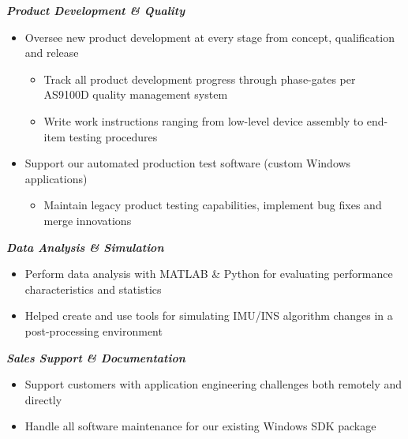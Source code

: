 \documentclass[]{article}
\begin{document}
\begin{singlespace}
\noindent\textbf{\emph{Product Development \& Quality}}
\vspace{-2mm}
\begin{itemize}
    \setlength\itemsep{0em}
    \item Oversee new product development at every stage from concept, qualification and release
    \vspace{-2mm}
    \begin{itemize}
        \setlength\itemsep{0em}
        \item Track all product development progress through phase-gates per AS9100D quality management system
        \item Write work instructions ranging from low-level device assembly to end-item testing procedures
    \end{itemize}
    \item Support our automated production test software (custom Windows applications)
    \vspace{-2mm}
    \begin{itemize}
        \setlength\itemsep{0em}
        \item Maintain legacy product testing capabilities, implement bug fixes and merge innovations
    \end{itemize}
\end{itemize}

\noindent\textbf{\emph{Data Analysis \& Simulation}}
\vspace{-2mm}
\begin{itemize}
    \setlength\itemsep{0em}
    \item Perform data analysis with MATLAB \& Python for evaluating performance characteristics and statistics
    \item Helped create and use tools for simulating IMU/INS algorithm changes in a post-processing environment
\end{itemize}

\noindent\textbf{\emph{Sales Support \& Documentation}}
\vspace{-2mm}
\begin{itemize}
    \setlength\itemsep{0em}
    \item Support customers with application engineering challenges both remotely and directly
    \item Handle all software maintenance for our existing Windows SDK package
\end{itemize}



\end{singlespace}
\end{document}
